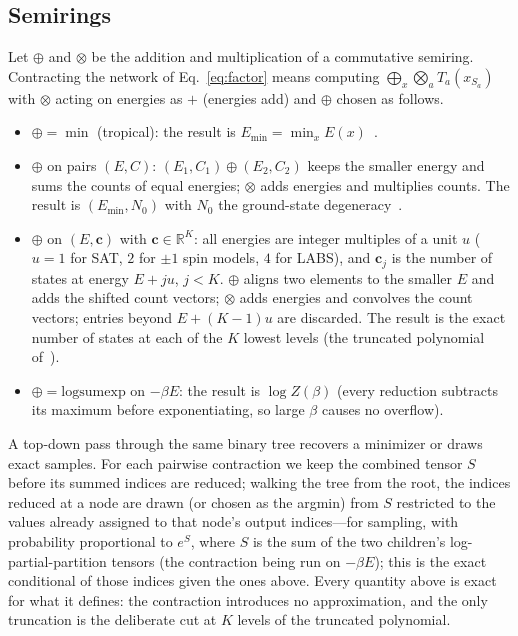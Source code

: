 \documentclass{article}
\newcommand{\Emin}{E_{\min}}
\newcommand{\N}{N_0}
\begin{document}
\subsection{Semirings}
Let $\oplus$ and $\otimes$ be the addition and multiplication of a commutative semiring. Contracting the network of Eq.~\eqref{eq:factor} means computing $\bigoplus_{x}\bigotimes_a T_a(x_{S_a})$ with $\otimes$ acting on energies as $+$ (energies add) and $\oplus$ chosen as follows.
\begin{itemize}
\item $\oplus=\min$ (tropical): the result is $\Emin=\min_x E(x)$~\cite{liu2021tropical}.
\item $\oplus$ on pairs $(E,C)$: $(E_1,C_1)\oplus(E_2,C_2)$ keeps the smaller energy and sums the counts of equal energies; $\otimes$ adds energies and multiplies counts. The result is $(\Emin,\N)$ with $\N$ the ground-state degeneracy~\cite{liu2021tropical,liu2023generic}.
\item $\oplus$ on $(E,\mathbf{c})$ with $\mathbf{c}\in\mathbb{R}^K$: all energies are integer multiples of a unit $u$ ($u=1$ for SAT, $2$ for $\pm1$ spin models, $4$ for LABS), and $\mathbf{c}_j$ is the number of states at energy $E+ju$, $j<K$. $\oplus$ aligns two elements to the smaller $E$ and adds the shifted count vectors; $\otimes$ adds energies and convolves the count vectors; entries beyond $E+(K-1)u$ are discarded. The result is the exact number of states at each of the $K$ lowest levels (the truncated polynomial of~\cite{liu2023generic}).
\item $\oplus=\mathrm{logsumexp}$ on $-\beta E$: the result is $\log Z(\beta)$ (every reduction subtracts its maximum before exponentiating, so large $\beta$ causes no overflow).
\end{itemize}
A top-down pass through the same binary tree recovers a minimizer or draws exact samples. For each pairwise contraction we keep the combined tensor $S$ before its summed indices are reduced; walking the tree from the root, the indices reduced at a node are drawn (or chosen as the argmin) from $S$ restricted to the values already assigned to that node's output indices---for sampling, with probability proportional to $e^{S}$, where $S$ is the sum of the two children's log-partial-partition tensors (the contraction being run on $-\beta E$); this is the exact conditional of those indices given the ones above. Every quantity above is exact for what it defines: the contraction introduces no approximation, and the only truncation is the deliberate cut at $K$ levels of the truncated polynomial.
\end{document}
